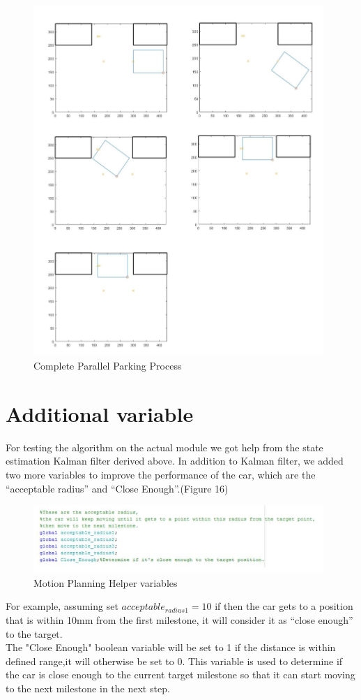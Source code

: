 \documentclass[12pt, letterpaper]{amsart} %
\numberwithin{equation}{section}
\begin{document}
\begin{figure}[h!]
\includegraphics[width=110mm]{./img/fig_15.png}
\caption{Complete Parallel Parking Process}
\label{fig:figure15}	
\end{figure}
\newpage
\section{Additional variable}
For testing the algorithm on the actual module we got help from the state estimation Kalman filter derived above. 
In addition to Kalman filter, we added two more variables to improve the performance of the car, which are the “acceptable radius” and “Close Enough”.(Figure 16)
\begin{figure}[h!]
\includegraphics[width=110mm]{./img/fig_16.png}
\caption{Motion Planning Helper variables}
\label{fig:figure16}	
\end{figure}

For example, assuming set $acceptable_{radius1}=10$ if then the car gets to a position that is within 
10mm from the first milestone, it will consider it
as “close enough” to the target.
\\ The "Close Enough" boolean variable will be set to 1 if the distance is within defined range,it will otherwise be set to 0. This 
variable is used to determine if the car is close 
enough to the current target milestone so that it can 
start moving to the next milestone in the next step.
\end{document}
